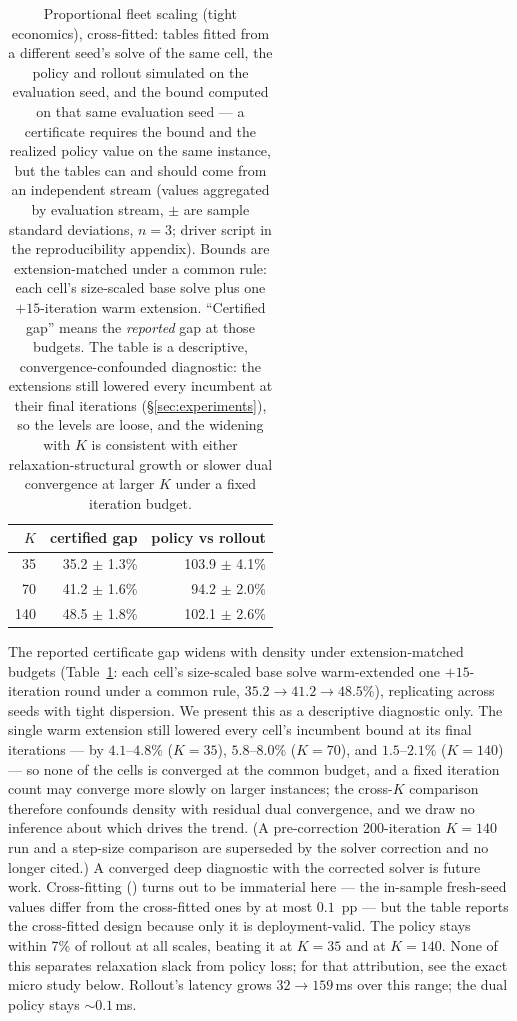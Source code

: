 \documentclass[11pt]{article}
\begin{document}
\begin{table}[t]
\centering
\caption{Proportional fleet scaling (tight economics), cross-fitted:
tables fitted from a different seed's solve of the same cell, the
policy and rollout simulated on the evaluation seed, and the bound
computed on that same evaluation seed --- a certificate requires the
bound and the realized policy value on the same instance, but the
tables can and should come from an independent stream (values
aggregated by evaluation stream, $\pm$ are sample standard
deviations, $n = 3$; driver script in the reproducibility appendix).
Bounds are extension-matched under a common rule: each cell's
size-scaled base solve plus one $+15$-iteration warm extension.
``Certified gap'' means the \emph{reported} gap at those budgets.
The table is a descriptive, convergence-confounded diagnostic: the
extensions still lowered every incumbent at their final iterations
(\S\ref{sec:experiments}), so the levels are loose, and the widening
with $K$ is consistent with either relaxation-structural growth or
slower dual convergence at larger $K$ under a fixed iteration
budget.}
\label{tab:scaling}
\small
\begin{tabular}{rrr}
\toprule
$K$ & certified gap & policy vs rollout \\
\midrule
35 & 35.2 $\pm$ 1.3\% & 103.9 $\pm$ 4.1\% \\
70 & 41.2 $\pm$ 1.6\% & 94.2 $\pm$ 2.0\% \\
140 & 48.5 $\pm$ 1.8\% & 102.1 $\pm$ 2.6\% \\
\bottomrule
\end{tabular}
\end{table}

The reported certificate gap widens with density under
extension-matched budgets (Table~\ref{tab:scaling}: each cell's
size-scaled base solve warm-extended one $+15$-iteration round under
a common rule, $35.2 \to 41.2 \to 48.5\%$), replicating across seeds
with tight dispersion. We present this as a descriptive diagnostic
only. The single warm extension still lowered every cell's incumbent
bound at its final iterations --- by $4.1$--$4.8\%$ ($K = 35$),
$5.8$--$8.0\%$ ($K = 70$), and $1.5$--$2.1\%$ ($K = 140$) --- so
none of the cells is converged at the common budget, and a fixed
iteration count may converge more slowly on larger instances; the
cross-$K$ comparison therefore confounds density with residual dual
convergence, and we draw no inference about which drives the trend.
(A pre-correction 200-iteration $K = 140$ run and a step-size
comparison are superseded by the solver correction and no longer
cited.) A converged deep diagnostic with the corrected solver is
future work. Cross-fitting
() turns out to
be immaterial here --- the in-sample fresh-seed values differ from
the cross-fitted ones by at most $0.1$~pp --- but the table reports
the cross-fitted design because only it is deployment-valid. The
policy stays within 7\% of
rollout at all scales, beating it at $K = 35$ and at
$K = 140$. None of this separates
relaxation slack from policy loss; for that attribution, see the exact
micro study below. Rollout's latency
grows $32 \to 159$\,ms over this
range; the dual policy stays ${\sim}0.1$\,ms.
\end{document}
